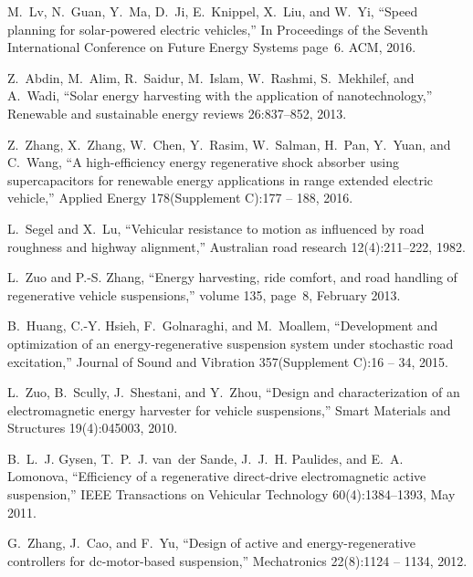 M.~Lv, N.~Guan, Y.~Ma, D.~Ji, E.~Knippel, X.~Liu, and W.~Yi,
\newblock ``Speed planning for solar-powered electric vehicles,''
\newblock In Proceedings of the Seventh International Conference on Future Energy Systems page~6. ACM, 2016.  

Z.~Abdin, M.~Alim, R.~Saidur, M.~Islam, W.~Rashmi, S.~Mekhilef, and A.~Wadi,
\newblock ``Solar energy harvesting with the application of nanotechnology,''
\newblock Renewable and sustainable energy reviews 26:837--852, 2013.

Z.~Zhang, X.~Zhang, W.~Chen, Y.~Rasim, W.~Salman, H.~Pan, Y.~Yuan, and C.~Wang,
\newblock ``A high-efficiency energy regenerative shock absorber using
  supercapacitors for renewable energy applications in range extended electric vehicle,''
\newblock Applied Energy 178(Supplement C):177 -- 188, 2016.

L.~Segel and X.~Lu,
\newblock ``Vehicular resistance to motion as influenced by road roughness and highway alignment,''
\newblock Australian road research 12(4):211--222, 1982.

L.~Zuo and P.-S. Zhang,
\newblock ``Energy harvesting, ride comfort, and road handling of regenerative vehicle suspensions,''
\newblock volume 135, page~8, February 2013.

B.~Huang, C.-Y. Hsieh, F.~Golnaraghi, and M.~Moallem,
\newblock ``Development and optimization of an energy-regenerative suspension
  system under stochastic road excitation,''
\newblock Journal of Sound and Vibration 357(Supplement C):16 -- 34,
  2015.

L.~Zuo, B.~Scully, J.~Shestani, and Y.~Zhou,
\newblock ``Design and characterization of an electromagnetic energy harvester for vehicle suspensions,''
\newblock Smart Materials and Structures 19(4):045003, 2010.

B.~L.~J. Gysen, T.~P.~J. van~der Sande, J.~J.~H. Paulides, and E.~A. Lomonova,
\newblock ``Efficiency of a regenerative direct-drive electromagnetic active
  suspension,''
\newblock IEEE Transactions on Vehicular Technology 60(4):1384--1393,
  May 2011.

G.~Zhang, J.~Cao, and F.~Yu,
\newblock ``Design of active and energy-regenerative controllers for
  dc-motor-based suspension,''
\newblock Mechatronics 22(8):1124 -- 1134, 2012.


